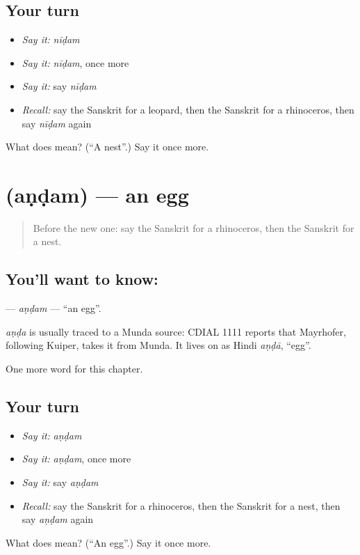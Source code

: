 \subsection*{Your turn}
\begin{itemize}
\raggedright
  \item \emph{Say it:} \emph{nīḍam}
  \item \emph{Say it:} \emph{nīḍam}, once more
  \item \emph{Say it:} say \emph{nīḍam}
  \item \emph{Recall:} say the Sanskrit for a leopard, then the Sanskrit for a rhinoceros, then say \emph{nīḍam} again
\end{itemize}

\begin{tcolorbox}[breakable,colback=teal!4,colframe=teal!35!black,title={Before you move on}]
What does  mean? (\textquotedblleft{}A nest\textquotedblright{}.) Say it once more.
\end{tcolorbox}
\section[\texorpdfstring{\sk{अण्डम्} (aṇḍam)}{अण्डम् (aṇḍam)}]{ (aṇḍam) — an egg}

\label{lesson:SA-C198-andam}



\begin{quote}
Before the new one: say the Sanskrit for a rhinoceros, then the Sanskrit for a nest.
\end{quote}

\subsection*{You'll want to know: }
\textbf{} — \emph{aṇḍam} — \textquotedblleft{}an egg\textquotedblright{}.

\begin{cousinweb}
\emph{aṇḍa} is usually traced to a Munda source: CDIAL 1111 reports that Mayrhofer, following Kuiper, takes it from Munda. It lives on as Hindi \emph{aṇḍā}, \textquotedblleft{}egg\textquotedblright{}.
\end{cousinweb}

\begin{grammarlens}[title={What you've built}]
One more word for this chapter.
\end{grammarlens}

\subsection*{Your turn}
\begin{itemize}
\raggedright
  \item \emph{Say it:} \emph{aṇḍam}
  \item \emph{Say it:} \emph{aṇḍam}, once more
  \item \emph{Say it:} say \emph{aṇḍam}
  \item \emph{Recall:} say the Sanskrit for a rhinoceros, then the Sanskrit for a nest, then say \emph{aṇḍam} again
\end{itemize}

\begin{tcolorbox}[breakable,colback=teal!4,colframe=teal!35!black,title={Before you move on}]
What does  mean? (\textquotedblleft{}An egg\textquotedblright{}.) Say it once more.
\end{tcolorbox}
